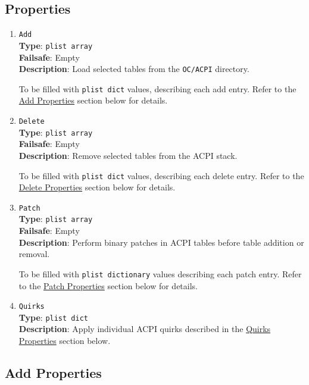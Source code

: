 \documentclass[]{article}
\begin{document}
\subsection{Properties}\label{acpiprops}

\begin{enumerate}
\item
  \texttt{Add}\\
  \textbf{Type}: \texttt{plist\ array}\\
  \textbf{Failsafe}: Empty\\
  \textbf{Description}: Load selected tables from the \texttt{OC/ACPI}
  directory.

  To be filled with \texttt{plist\ dict} values, describing each add entry.
  Refer to the \hyperref[acpipropsadd]{Add Properties} section below for details.

\item
  \texttt{Delete}\\
  \textbf{Type}: \texttt{plist\ array}\\
  \textbf{Failsafe}: Empty\\
  \textbf{Description}: Remove selected tables from the ACPI stack.

  To be filled with \texttt{plist\ dict} values, describing each delete entry.
  Refer to the \hyperref[acpipropsdelete]{Delete Properties} section below for details.

\item
  \texttt{Patch}\\
  \textbf{Type}: \texttt{plist\ array}\\
  \textbf{Failsafe}: Empty\\
  \textbf{Description}: Perform binary patches in ACPI tables before
  table addition or removal.

  To be filled with \texttt{plist\ dictionary} values describing each patch entry.
  Refer to the \hyperref[acpipropspatch]{Patch Properties} section below for details.

\item
  \texttt{Quirks}\\
  \textbf{Type}: \texttt{plist\ dict}\\
  \textbf{Description}: Apply individual ACPI quirks described
  in the \hyperref[acpipropsquirks]{Quirks Properties} section below.

\end{enumerate}

\subsection{Add Properties}\label{acpipropsadd}
\end{document}
